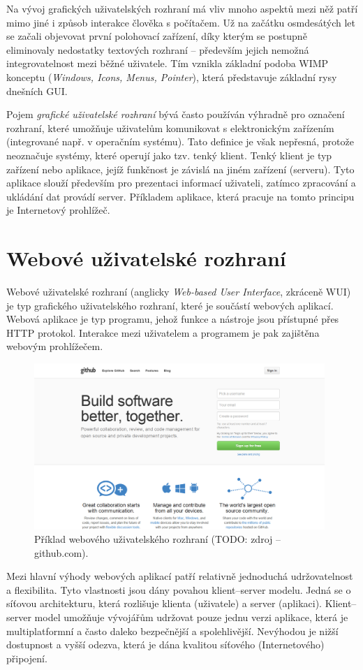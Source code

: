 Na vývoj grafických uživatelských rozhraní má vliv mnoho aspektů mezi něž patří mimo jiné i způsob interakce člověka s počítačem. Už na začátku osmdesátých let se začali objevovat první polohovací zařízení, díky kterým se postupně eliminovaly nedostatky textových rozhraní -- především jejich nemožná integrovatelnost mezi běžné uživatele. Tím vznikla základní podoba WIMP konceptu (\textit{Windows, Icons, Menus, Pointer}), která představuje základní rysy dnešních GUI.

Pojem \textit{grafické uživatelské rozhraní} bývá často používán výhradně pro označení rozhraní, které umožňuje uživatelům komunikovat s elektronickým zařízením (integrované např. v operačním systému). Tato definice je však nepřesná, protože neoznačuje systémy, které operují jako tzv. tenký klient. Tenký klient je typ zařízení nebo aplikace, jejíž funkčnost je závislá na jiném zařízení (serveru). Tyto aplikace slouží především pro prezentaci informací uživateli, zatímco zpracování a ukládání dat provádí server. Příkladem aplikace, která pracuje na tomto principu je Internetový prohlížeč.

\section{Webové uživatelské rozhraní}

Webové uživatelské rozhraní (anglicky \textit{Web-based User Interface}, zkráceně WUI) je typ grafického uživatelského rozhraní, které je součástí webových aplikací. Webová aplikace je typ programu, jehož funkce a nástroje jsou přístupné přes HTTP protokol. Interakce mezi uživatelem a programem je pak zajištěna webovým prohlížečem.

\begin{figure}[htbp]
    \centering
    \includegraphics[width=11cm]{images/wui-example.png}
    \caption{Příklad webového uživatelského rozhraní (TODO: zdroj -- github.com).}
\end{figure}

Mezi hlavní výhody webových aplikací patří relativně jednoduchá udržovatelnost a flexibilita. Tyto vlastnosti jsou dány povahou klient--server modelu. Jedná se o síťovou architekturu, která rozlišuje klienta (uživatele) a server (aplikaci). Klient--server model umožňuje vývojářům udržovat pouze jednu verzi aplikace, která je multiplatformní a často daleko bezpečnější a spolehlivější. Nevýhodou je nižší dostupnost a vyšší odezva, která je dána kvalitou síťového (Internetového) připojení.
